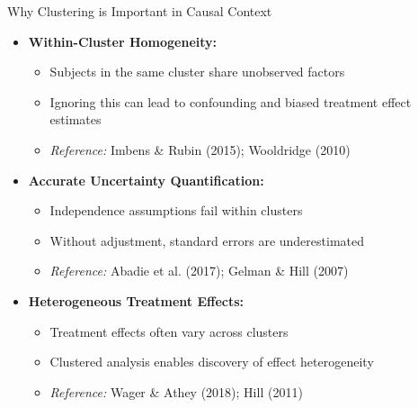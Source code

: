 \documentclass{beamer}
\begin{document}
\begin{frame}{Why Clustering is Important in Causal Context}
\begin{itemize}
    \item \textbf{Within-Cluster Homogeneity:} 
    \begin{itemize}
        \item Subjects in the same cluster share unobserved factors
        \item Ignoring this can lead to confounding and biased treatment effect estimates
        \item \textit{Reference:} Imbens \& Rubin (2015); Wooldridge (2010)
    \end{itemize}
    \item \textbf{Accurate Uncertainty Quantification:}
    \begin{itemize}
        \item Independence assumptions fail within clusters
        \item Without adjustment, standard errors are underestimated
        \item \textit{Reference:} Abadie et al. (2017); Gelman \& Hill (2007)
    \end{itemize}
    \item \textbf{Heterogeneous Treatment Effects:}
    \begin{itemize}
        \item Treatment effects often vary across clusters
        \item Clustered analysis enables discovery of effect heterogeneity
        \item \textit{Reference:} Wager \& Athey (2018); Hill (2011)
    \end{itemize}
\end{itemize}
\end{frame}
\end{document}
